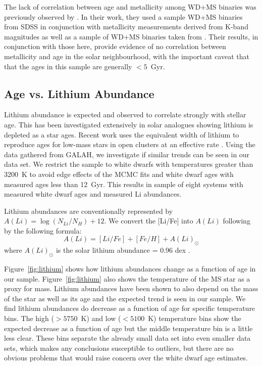 \documentclass[twocolumn,linenumbers]{aastex631}
\begin{document}
The lack of correlation between age and metallicity among WD+MS binaries was previously observed by \cite{2021MNRAS.505.3165R}. In their work, they used a sample WD+MS binaries from SDSS in conjunction with metallicity measurements derived from K-band magnitudes as well as a sample of WD+MS binaries taken from \cite{2016MNRAS.458.3808R}. Their results, in conjunction with those here, provide evidence of no correlation between metallicity and age in the solar neighbourhood, with the important caveat that that the ages in this sample are generally $<5$~Gyr.

\subsection{Age vs. Lithium Abundance}

Lithium abundance is expected and observed to correlate strongly with stellar age. This has been investigated extensively in solar analogues \citep[e.g.,][]{2016A&A...587A.100C, 2023MNRAS.522.3217M} showing lithium is depleted as a star ages. Recent work uses the equivalent width of lithium to reproduce ages for low-mass stars in open clusters at an effective rate \citep{2023MNRAS.523..802J}. Using the data gathered from GALAH, we investigate if similar trends can be seen in our data set. We restrict the sample to white dwarfs with temperatures greater than 3200~K to avoid edge effects of the MCMC fits and white dwarf ages with measured ages less than 12~Gyr. This results in sample of eight systems with measured white dwarf ages and measured Li abundances.

Lithium abundances are conventionally represented by $A(Li) = \log{(N_{Li}/N_H)} + 12$. We convert the [Li/Fe] into $A(Li)$ following \cite{2022A&A...668A.181B} by the following formula:
\begin{equation}
    A(Li) = [Li/Fe] + [Fe/H] + A(Li)_\odot
\end{equation}
where $A(Li)_\odot$ is the solar lithium abundance = 0.96 dex \citep{2021MNRAS.500.2159W}.

Figure~\ref{fig:lithium} shows how lithium abundances change as a function of age in our sample. Figure~\ref{fig:lithium} also shows the temperature of the MS star as a proxy for mass. Lithium abundances have been shown to also depend on the mass of the star as well as its age \citep[e.g.][]{2015A&A...579A.122A} and the expected trend is seen in our sample. We find lithium abundances do decrease as a function of age for specific temperature bins. The high ($>5750$~K) and low ($<5100$~K) temperature bins show the expected decrease as a function of age but the middle temperature bin is a little less clear. These bins separate the already small data set into even smaller data sets, which makes any conclusions susceptible to outliers, but there are no obvious problems that would raise concern over the white dwarf age estimates. 
\end{document}
